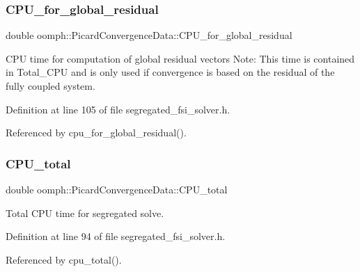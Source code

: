 \subsubsection{\texorpdfstring{C\+P\+U\+\_\+for\+\_\+global\+\_\+residual}{CPU\_for\_global\_residual}}
{\footnotesize\ttfamily double oomph\+::\+Picard\+Convergence\+Data\+::\+C\+P\+U\+\_\+for\+\_\+global\+\_\+residual\hspace{0.3cm}{\ttfamily [private]}}



C\+PU time for computation of global residual vectors Note\+: This time is contained in Total\+\_\+\+C\+PU and is only used if convergence is based on the residual of the fully coupled system. 



Definition at line 105 of file segregated\+\_\+fsi\+\_\+solver.\+h.



Referenced by cpu\+\_\+for\+\_\+global\+\_\+residual().

\mbox{\label{classoomph_1_1PicardConvergenceData_ae2fe34d1dc2f889d89fd75a8f0805e21}} 
\subsubsection{\texorpdfstring{C\+P\+U\+\_\+total}{CPU\_total}}
{\footnotesize\ttfamily double oomph\+::\+Picard\+Convergence\+Data\+::\+C\+P\+U\+\_\+total\hspace{0.3cm}{\ttfamily [private]}}



Total C\+PU time for segregated solve. 



Definition at line 94 of file segregated\+\_\+fsi\+\_\+solver.\+h.



Referenced by cpu\+\_\+total().

\mbox{\label{classoomph_1_1PicardConvergenceData_aa79f69879023de7cd55d7343a504b3b6}} 
